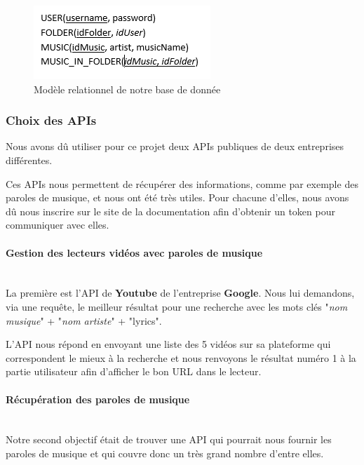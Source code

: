 \documentclass[12pt,french]{article}
\begin{document}
\begin{figure}[H]
	\centering
	\includegraphics[scale=1]{table.png}
	\caption{Modèle relationnel de notre base de donnée}  
	\label{figure6}   
\end{figure}


\subsubsection{Choix des APIs}
\label{choix-api-sec}

Nous avons dû utiliser pour ce projet deux \gls{API}s publiques de deux entreprises différentes.

\medskip

Ces \gls{API}s nous permettent de récupérer des informations, comme par exemple des paroles de musique, et nous ont été très utiles. Pour chacune d'elles, nous avons dû nous inscrire sur le site de la documentation afin d'obtenir un \gls{token} pour communiquer avec elles.

\paragraph{Gestion des lecteurs vidéos avec paroles de musique \\\\}

La première est l'\gls{API} de \textbf{Youtube} de l'entreprise \textbf{Google}. Nous lui demandons, via une requête, le meilleur résultat pour une recherche avec les mots clés "\textit{nom musique}" + "\textit{nom artiste}" + "lyrics".

L'\gls{API} nous répond en envoyant une liste des 5 vidéos sur sa plateforme qui correspondent le mieux à la recherche et nous renvoyons le résultat numéro 1 à la partie utilisateur afin d'afficher le bon URL dans le lecteur.

\paragraph{Récupération des paroles de musique \\\\}

Notre second objectif était de trouver une \gls{API} qui pourrait nous fournir les paroles de musique et qui couvre donc un très grand nombre d'entre elles.
\end{document}
